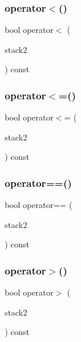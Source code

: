 \mbox{\label{classStack_a6d1900aec1af12a907ad87301d464d2e}} 
\subsubsection{\texorpdfstring{operator$<$()}{operator<()}}
{\footnotesize\ttfamily bool operator$<$ (\begin{DoxyParamCaption}\item[{const \mbox{\hyperlink{classStack}{Stack}}$<$ Value\+Type $>$ \&}]{stack2 }\end{DoxyParamCaption}) const}

\mbox{\label{classStack_a8037a3a4cc044bcfba994893d6f4ab12}} 
\subsubsection{\texorpdfstring{operator$<$=()}{operator<=()}}
{\footnotesize\ttfamily bool operator$<$= (\begin{DoxyParamCaption}\item[{const \mbox{\hyperlink{classStack}{Stack}}$<$ Value\+Type $>$ \&}]{stack2 }\end{DoxyParamCaption}) const}

\mbox{\label{classStack_ade246b6899202c53b8fd8fbe4930b09a}} 
\subsubsection{\texorpdfstring{operator==()}{operator==()}}
{\footnotesize\ttfamily bool operator== (\begin{DoxyParamCaption}\item[{const \mbox{\hyperlink{classStack}{Stack}}$<$ Value\+Type $>$ \&}]{stack2 }\end{DoxyParamCaption}) const}

\mbox{\label{classStack_a5031b32af5984055de8e2bdd4f7312c4}} 
\subsubsection{\texorpdfstring{operator$>$()}{operator>()}}
{\footnotesize\ttfamily bool operator$>$ (\begin{DoxyParamCaption}\item[{const \mbox{\hyperlink{classStack}{Stack}}$<$ Value\+Type $>$ \&}]{stack2 }\end{DoxyParamCaption}) const}

